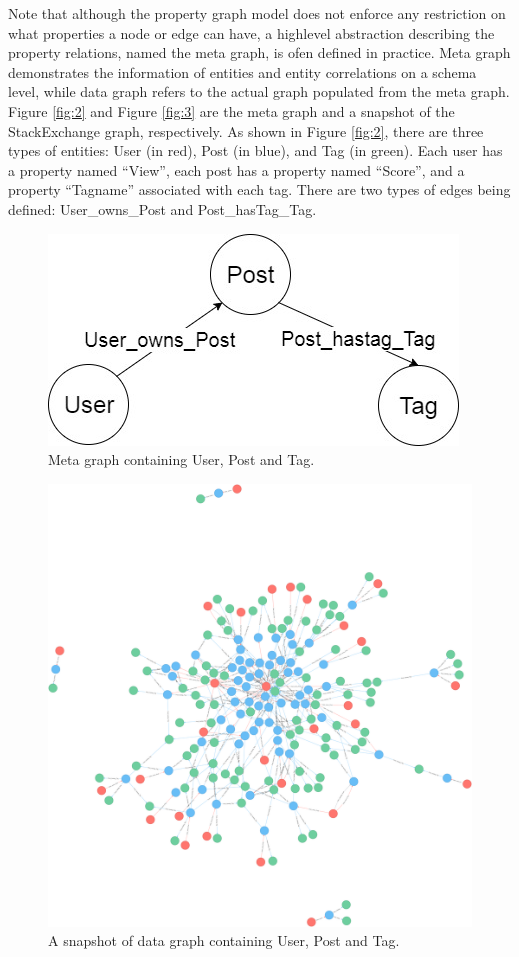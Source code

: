 Note that although the property graph model does not enforce any restriction on what properties a node or edge can have, a highlevel abstraction describing the property relations, named the meta graph, is ofen defined in practice. Meta graph demonstrates the information of entities and entity correlations on a schema level, while data graph refers to the actual graph populated from the meta graph. Figure \ref{fig:2} and Figure \ref{fig:3} are the meta graph and a snapshot of the StackExchange graph, respectively. As shown in Figure \ref{fig:2}, there are three types of entities: User (in red), Post (in blue), and Tag (in green). Each user has a property named ``View'', each post has a property named ``Score'', and a property ``Tagname'' associated with each tag. There are two types of edges being  defined: User\_owns\_Post and Post\_hasTag\_Tag. 


\begin{figure}[H]
\centering
\includegraphics[scale=0.5]{pic/12.jpg}
\caption{Meta graph containing User, Post and Tag.}
\end{figure}
 
\begin{figure}[H]
\centering
\includegraphics[scale=0.1]{pic/3.png}
\caption{A snapshot of data graph containing User, Post and Tag.}
\end{figure}

